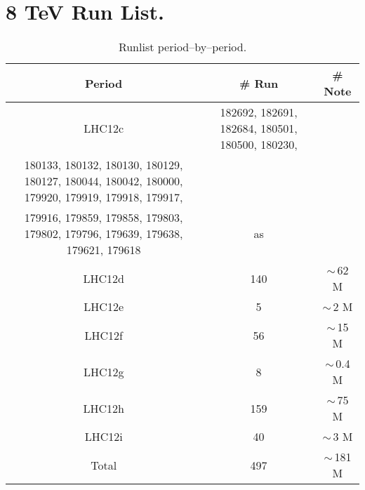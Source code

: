 
\section{8 TeV Run List.}

\begin{table}[hb]
\label{tab:RunSummary}
\begin{center}
\begin{tabular}[b]{|c|c|c|}
	\hline
	Period & \# Run & \# Note \\ \hline
	LHC12c & 182692, 182691, 182684, 180501, 180500, 180230, \\ 180133, 180132, 180130, 180129, 180127, 180044, 180042, 180000, 179920, 179919, 179918, 179917, \\179916, 179859, 179858, 179803, 179802, 179796, 179639, 179638, 179621, 179618 & as \\ \hline
	LHC12d & 140 & $\sim \,$62 M \\ \hline
	LHC12e & 5 & $\sim \,$2 M \\ \hline
	LHC12f & 56 & $\sim \,$15 M \\ \hline
	LHC12g & 8 & $\sim \,$0.4 M \\ \hline
	LHC12h & 159 & $\sim \,$75 M \\ \hline
	LHC12i & 40 & $\sim \,$3 M \\ \hline
	Total & 497 & $\sim \,$181 M \\ \hline

\end{tabular}
\end{center}
\caption{Runlist period--by--period.}
\end{table}